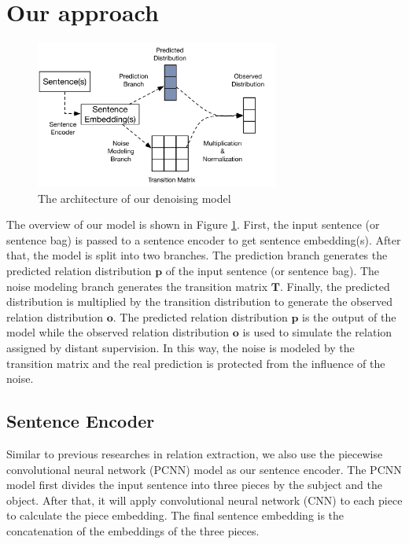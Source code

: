 \section{Our approach}

\begin{figure}[htbp]
\begin{center}
\includegraphics[width=8cm]{figures/denoise_framework.png}	
\caption{The architecture of our denoising model}
\label{fig: denoise_framework}
\end{center}
\end{figure}

The overview of our model is shown in Figure \ref{fig: denoise_framework}. First, the input sentence (or sentence bag) is passed to a sentence encoder to get sentence embedding(s). After that, the model is split into two branches. The prediction branch generates the predicted relation distribution $\mathbf{p}$ of the input sentence (or sentence bag). The noise modeling branch generates the transition matrix $\mathbf{T}$. Finally, the predicted distribution is multiplied by the transition distribution to generate the observed relation distribution $\mathbf{o}$. The predicted relation distribution $\mathbf{p}$ is the output of the model while the observed relation distribution $\mathbf{o}$ is used to simulate the relation assigned by distant supervision. In this way, the noise is modeled by the transition matrix and the real prediction is protected from the influence of the noise.

\subsection{Sentence Encoder}
Similar to previous researches in relation extraction, we also use the piecewise convolutional neural network (PCNN) model \cite{zeng2015distant} as our sentence encoder. The PCNN model first divides the input sentence into three pieces by the subject and the object. After that, it will apply convolutional neural network (CNN) to each piece to calculate the piece embedding. The final sentence embedding is the concatenation of the embeddings of the three pieces.

